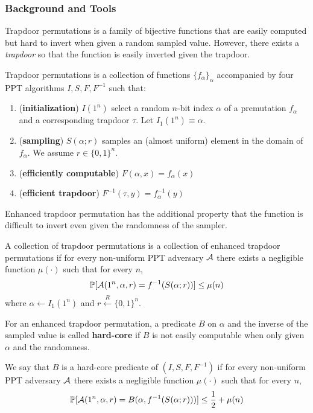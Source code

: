 \subsubsection{Background and Tools}
Trapdoor permutations is a family of bijective functions that are easily computed but hard to invert when given a random sampled value. However, there exists a \textit{trapdoor} so that the function is easily inverted given the trapdoor.
\begin{definition}
Trapdoor permutations is a collection of functions $\{f_\alpha\}_\alpha$ accompanied by four PPT algorithms $I,S,F,F^{-1}$ such that:
\begin{enumerate}
\item (\textbf{initialization}) $I(1^n)$ select a random $n$-bit index $\alpha$ of a premutation $f_\alpha$ and a corresponding trapdoor $\tau$. Let $I_1(1^n)\equiv\alpha$.
\item (\textbf{sampling}) $S(\alpha;r)$ samples an (almost uniform) element in the domain of $f_\alpha$. We assume $r\in\{0,1\}^n$.
\item (\textbf{efficiently computable}) $F(\alpha,x)=f_\alpha(x)$
\item (\textbf{efficient trapdoor}) $F^{-1}(\tau,y)=f^{-1}_\alpha(y)$
\end{enumerate}
\end{definition}
Enhanced trapdoor permutation has the additional property that the function is difficult to invert even given the randomness of the sampler.
\begin{definition} A collection of {\sf trapdoor permutations} is a collection of {\sf enhanced trapdoor permutations} if for every non-uniform PPT adversary $\mathcal{A}$ there exists a negligible function $\mu(\cdot)$ such that for every $n$,
$$\mathop{\mathbb P\/}[\mathcal{A}(1^n,\alpha,r)=f^{-1}(S(\alpha;r))]\leq\mu(n)$$
where $\alpha\leftarrow I_1(1^n)$ and $r\stackrel{R}{\leftarrow}\{0,1\}^n$.
\end{definition}
For an enhanced trapdoor permutation, a predicate $B$ on $\alpha$ and the inverse of the sampled value is called \textbf{hard-core} if $B$ is not easily computable when only given $\alpha$ and the randomness.
\begin{definition} We say that $B$ is a {\sf hard-core predicate} of $(I,S,F,F^{-1})$ if for every non-uniform PPT adversary $\mathcal{A}$ there exists a negligible function $\mu(\cdot)$ such that for every $n$,
$$\mathop{\mathbb P\/}[\mathcal{A}(1^n,\alpha,r)=B(\alpha, f^{-1}(S(\alpha;r)))]\leq\frac{1}{2}+\mu(n)$$
\end{definition}
